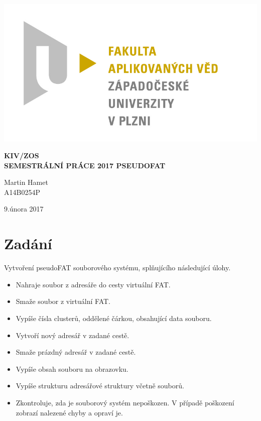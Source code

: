 \documentclass[12pt]{article}
\begin{document}
\begin{titlepage}
\includegraphics[scale=0.2, trim=5cm 0 0 30cm]{logo.jpg}
\begin{center}
\vspace{5cm}
{\Huge
\textbf{KIV/ZOS}\\
\vspace{1cm}
}
{\Large
\textbf{SEMESTRÁLNÍ PRÁCE 2017 PSEUDOFAT}
}
\end{center}
\vspace{\fill}

\begin{minipage}[t]{5cm}
\flushleft
Martin Hamet\\
A14B0254P
\end{minipage}
\hfill
\begin{minipage}[t]{7cm}
\flushright
9.února 2017
\end{minipage}
\end{titlepage}

\tableofcontents
\newpage
\section{Zadání}
\label{zadani}
Vytvoření pseudoFAT souborového systému, splňujícího následující úlohy.

\begin{itemize}
\item Nahraje soubor z adresáře do cesty virtuální FAT.

\item Smaže soubor z virtuální FAT.

\item Vypíše čísla clusterů, oddělené čárkou, obsahující data souboru.

\item Vytvoří nový adresář v zadané cestě.

\item Smaže prázdný adresář v zadané cestě.

\item Vypíše obsah souboru na obrazovku.

\item Vypíše strukturu adresářové struktury včetně souborů.

\item Zkontroluje, zda je souborový systém nepoškozen. V případě poškození zobrazí nalezené chyby a opraví je.

\end{itemize}
\end{document}
